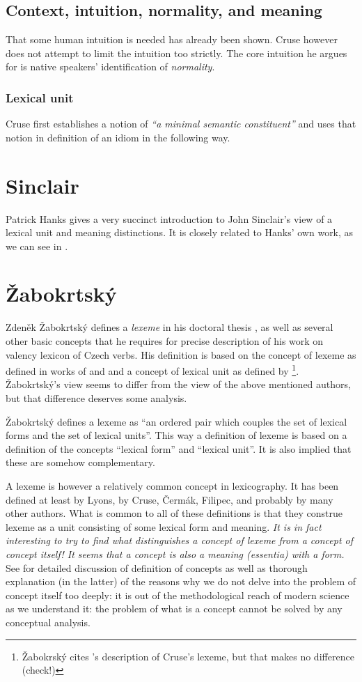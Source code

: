 \subsection{Context, intuition, normality, and meaning}
That some human intuition is needed has already been shown. Cruse however does not attempt to limit the intuition too strictly. The core intuition he argues for is native speakers' identification of \emph{normality}. 

\subsubsection{Lexical unit}
Cruse first establishes a notion of \emph{``a minimal semantic constituent''} and uses that notion in definition of an idiom in the following way.


\section{Sinclair}
Patrick Hanks gives a very succinct introduction to John Sinclair's \citep{sinclair:wiki} view of a lexical unit and meaning distinctions. It is closely related to Hanks' own work, as we can see in \citet{hanks:norms}.

\section{Žabokrtský}
Zdeněk Žabokrtský defines a \emph{lexeme} in his doctoral thesis \citep{zabokrtsky:2005a}, as well as several other basic concepts that he requires for precise description of his work on valency lexicon of Czech verbs. His definition is based on the concept of lexeme as defined in works of \citet{cermak:91} and \citet{filipec:1994} and a concept of lexical unit as defined by \citet{cruse:1986}\footnote{Žabokrský cites \citealp{verspoor:1997}'s description of Cruse's lexeme, but that makes no difference {\xxx(check!)}}. Žabokrtský's view seems to differ from the view of the above mentioned authors, but that difference deserves some analysis.

Žabokrtský defines a lexeme as ``an ordered pair which couples the set of lexical forms and the set of lexical units''. This way a definition of lexeme is based on a definition of the concepts ``lexical form'' and ``lexical unit''. It is also implied that these are somehow complementary. 

A lexeme is however a relatively common concept in lexicography. It has been defined at least by Lyons, by Cruse, Čermák, Filipec, and probably by many other authors. What is common to all of these definitions is that they construe lexeme as a unit consisting of some lexical form and meaning. 
\emph{It is in fact interesting to try to find what distinguishes a concept of lexeme from a concept of concept itself! It seems that a concept is also a meaning (essentia) with a form.} See \citet{materna:1998,stranak:2001} for detailed discussion of definition of concepts as well as thorough explanation (in the latter) of the reasons why we do not delve into the problem of concept itself too deeply: it is out of the methodological reach of modern science as we understand it: the problem of what is a concept cannot be solved by any conceptual analysis.

